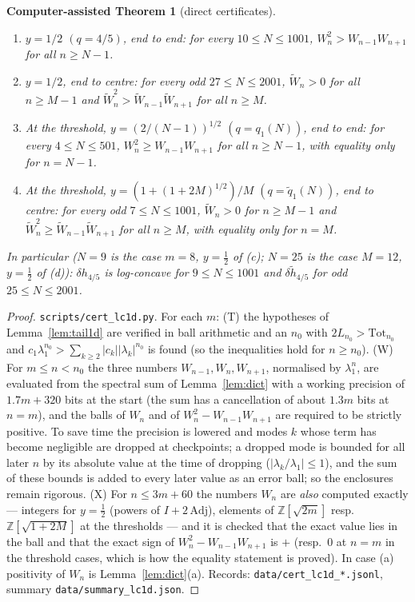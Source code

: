 \documentclass[11pt,a4paper]{article}
\newtheorem{catheorem}[theorem]{Computer-assisted Theorem}
\theoremstyle{definition}
\begin{document}
\begin{catheorem}[direct certificates]\label{thm:direct}
\begin{enumerate}
\item[(a)] $y=1/2$ $(q=4/5)$, end to end: for every $10\le N\le1001$, $W_n^2>W_{n-1}W_{n+1}$ for all $n\ge N-1$.
\item[(b)] $y=1/2$, end to centre: for every odd $27\le N\le2001$, $\tilde W_n>0$ for all $n\ge M-1$ and $\tilde W_n^2>\tilde W_{n-1}\tilde W_{n+1}$ for all $n\ge M$.
\item[(c)] \emph{At the threshold}, $y=(2/(N-1))^{1/2}$ $(q=q_1(N))$, end to end: for every $4\le N\le501$, $W_n^2\ge W_{n-1}W_{n+1}$ for all $n\ge N-1$, with equality only for $n=N-1$.
\item[(d)] \emph{At the threshold}, $y=(1+(1+2M)^{1/2})/M$ $(q=\tilde q_1(N))$, end to centre: for every odd $7\le N\le1001$, $\tilde W_n>0$ for $n\ge M-1$ and $\tilde W_n^2\ge\tilde W_{n-1}\tilde W_{n+1}$ for all $n\ge M$, with equality only for $n=M$.
\end{enumerate}
In particular ($N=9$ is the case $m=8$, $y=\frac12$ of \textup{(c)}; $N=25$ is the case $M=12$, $y=\frac12$ of \textup{(d)}): $\delta h_{4/5}$ is log-concave for $9\le N\le1001$ and $\delta\tilde h_{4/5}$ for odd $25\le N\le2001$.
\end{catheorem}
\begin{proof}
\texttt{scripts/cert\_lc1d.py}. For each $m$: (T) the hypotheses of Lemma~\ref{lem:tail1d} are verified in ball arithmetic and an $n_0$ with $2L_{n_0}>\mathrm{Tot}_{n_0}$ and $c_1\lambda_1^{n_0}>\sum_{k\ge2}|c_k||\lambda_k|^{n_0}$ is found (so the inequalities hold for $n\ge n_0$). (W) For $m\le n<n_0$ the three numbers $W_{n-1},W_n,W_{n+1}$, normalised by $\lambda_1^n$, are evaluated from the spectral sum of Lemma~\ref{lem:dict} with a working precision of $1.7m+320$ bits at the start (the sum has a cancellation of about $1.3m$ bits at $n=m$), and the balls of $W_n$ and of $W_n^2-W_{n-1}W_{n+1}$ are required to be strictly positive. To save time the precision is lowered and modes $k$ whose term has become negligible are dropped at checkpoints; a dropped mode is bounded for all later $n$ by its absolute value at the time of dropping ($|\lambda_k/\lambda_1|\le1$), and the sum of these bounds is added to every later value as an error ball; so the enclosures remain rigorous. (X) For $n\le3m+60$ the numbers $W_n$ are \emph{also} computed exactly --- integers for $y=\frac12$ (powers of $I+2\,\mathrm{Adj}$), elements of $\mathbb Z[\sqrt{2m}]$ resp.\ $\mathbb Z[\sqrt{1+2M}]$ at the thresholds --- and it is checked that the exact value lies in the ball and that the exact sign of $W_n^2-W_{n-1}W_{n+1}$ is $+$ (resp.\ $0$ at $n=m$ in the threshold cases, which is how the equality statement is proved). In case (a) positivity of $W_n$ is Lemma~\ref{lem:dict}(a). Records: \texttt{data/cert\_lc1d\_*.jsonl}, summary \texttt{data/summary\_lc1d.json}.
\end{proof}
\end{document}
